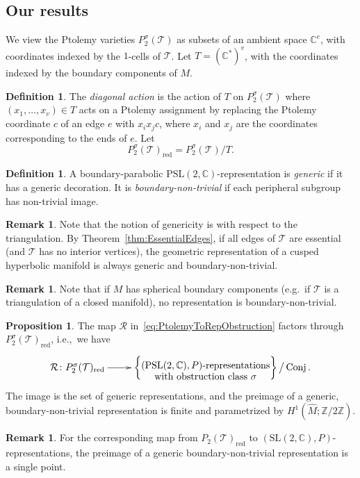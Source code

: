 \documentclass[12pt]{amsart}
\theoremstyle{definition}
\newtheorem{proposition}[theorem]{Proposition}
\newtheorem{definition}[theorem]{Definition}
\newtheorem{remark}[theorem]{Remark}
\numberwithin{equation}{section}
\def\cxymatrix#1{\xy*[c]\xybox{\xymatrix#1}\endxy}
\def\SL{\mathrm{SL}}
\def\PSL{\mathrm{PSL}}
\DeclareMathOperator{\Conj}{Conj}
\def\Z{\mathbb{Z}}
\def\C{\mathbb{C}}
\def\T{\mathcal{T}}
\def\rd{\mathrm{red}}
\begin{document}
\subsection{Our results}
We view the Ptolemy varieties $P^\sigma_2(\T)$ as subsets of an ambient space $\C^e$, with coordinates indexed by the $1$-cells of $\T$. Let $T=(\C^*)^v$, with the coordinates indexed by the boundary components of $M$. 

\begin{definition} The \emph{diagonal action} is the action of $T$ on $P^\sigma_2(\T)$ where $(x_1,\dots,x_v)\in T$ acts on a Ptolemy assignment by replacing the Ptolemy coordinate $c$ of an edge $e$ with $x_ix_jc$, where $x_i$ and $x_j$ are the coordinates corresponding to the ends of $e$. Let 
\begin{equation}
P^\sigma_2(\T)_\rd=P^\sigma_2(\T)\big/T.
\end{equation}
\end{definition}


\begin{definition}
A boundary-parabolic $\PSL(2,\C)$-representation is \emph{generic} if it has a generic decoration. It is \emph{boundary-non-trivial} if each peripheral subgroup has non-trivial image.
\end{definition}
\begin{remark}
Note that the notion of genericity is with respect to the triangulation. By Theorem~\ref{thm:EssentialEdges}, if all edges of $\T$ are essential (and $\T$ has no interior vertices), the geometric representation of a cusped hyperbolic manifold is always generic and boundary-non-trivial.
\end{remark}
\begin{remark}
Note that if $M$ has spherical boundary components (e.g.~if $\T$ is a triangulation of a closed manifold), no representation is boundary-non-trivial.
\end{remark}

\begin{proposition}\label{prop:GenericBoundaryNonTrivial}
The map $\mathcal R$ in~\eqref{eq:PtolemyToRepObstruction} factors through $P_2^{\sigma}(\T)_{\rd}$, i.e.,~we have
\begin{equation}\label{eq:GenericBoundaryNonTrivial}
\cxymatrix{{\mathcal R\colon P_2^{\sigma}(\T)_{\rd}\ar@{->}[r]& \left\{\txt{$(\PSL(2,\C),P)$-representations\\with obstruction class $\sigma$}\right\}\big/\Conj.}}
\end{equation}
The image is the set of generic representations, and the preimage of a generic, boundary-non-trivial representation is finite and parametrized by $H^1(\widehat M;\Z/2\Z)$. %
\end{proposition}
\begin{remark}
For the corresponding map from $P_2(\T)_\rd$ to $(\SL(2,\C),P)$-representations, the preimage of a generic boundary-non-trivial representation is a single point.
\end{remark}
\end{document}
